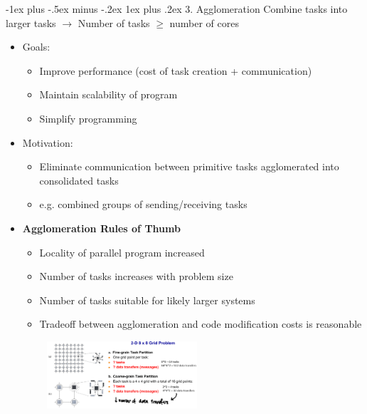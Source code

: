 \documentclass[10pt,landscape]{article}
\makeatletter
\newcommand{\subsubsubsection}{\@startsection{subsubsection}{3}{0mm}%
                                {-1ex plus -.5ex minus -.2ex}%
                                {1ex plus .2ex}%
                                {\normalfont\scriptsize\bfseries}}
\makeatother
\begin{document}
\begin{multicols*}{3}
\subsubsubsection{3. Agglomeration}
Combine tasks into larger tasks $\rightarrow$ Number of tasks $\geq$ number of cores
\begin{itemize}[topsep=0pt,noitemsep,wide=0pt, leftmargin=\dimexpr{} + 2\relax]
    \item Goals:
    \begin{itemize}[topsep=0pt,noitemsep,wide=0pt, leftmargin=\dimexpr{} + 2\relax]
        \item Improve performance (cost of task creation + communication)
        \item Maintain scalability of program
        \item Simplify programming
    \end{itemize}
    \item Motivation:
    \begin{itemize}[topsep=0pt,noitemsep,wide=0pt, leftmargin=\dimexpr{} + 2\relax]
        \item Eliminate communication between primitive tasks agglomerated into consolidated tasks
        \item e.g. combined groups of sending/receiving tasks
    \end{itemize}
    \item \textbf{Agglomeration Rules of Thumb}
    \begin{itemize}[topsep=0pt,noitemsep,wide=0pt, leftmargin=\dimexpr{} + 2\relax]
        \item Locality of parallel program increased
        \item Number of tasks increases with problem size
        \item Number of tasks suitable for likely larger systems
        \item Tradeoff between agglomeration and code modification costs is reasonable
    \end{itemize}
    \includegraphics*[width=7.4cm, height=2.5cm]{images/agglomeration.PNG}
\end{itemize}


\end{multicols*}
\end{document}
